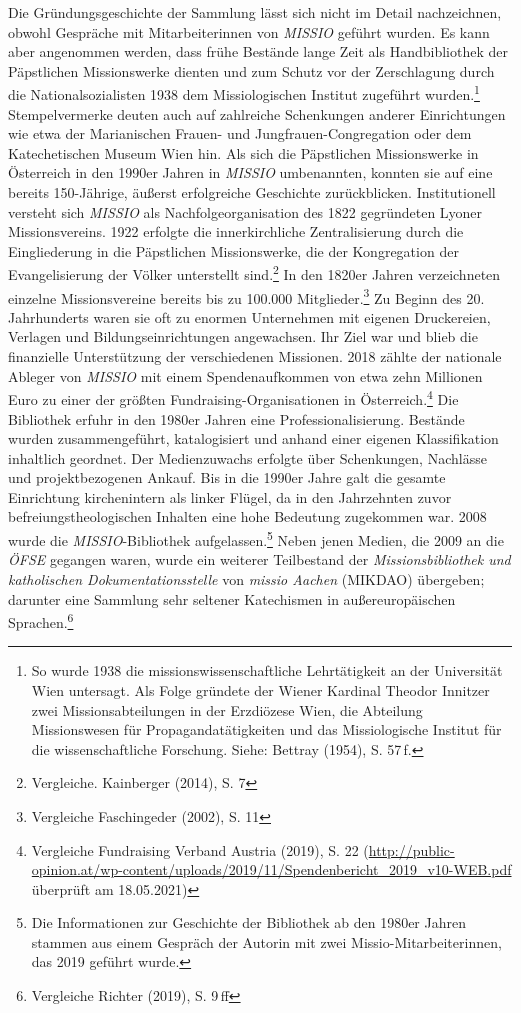 \documentclass[a4paper,
fontsize=11pt,
oneside,
numbers=noperiodatend,
parskip=half-,
bibliography=totoc,
final
]{scrartcl}
\begin{document}
Die Gründungsgeschichte der Sammlung lässt sich nicht im Detail
nachzeichnen, obwohl Gespräche mit Mitarbeiterinnen von \emph{MISSIO}
geführt wurden. Es kann aber angenommen werden, dass frühe Bestände
lange Zeit als Handbibliothek der Päpstlichen Missionswerke dienten und
zum Schutz vor der Zerschlagung durch die Nationalsozialisten 1938 dem
Missiologischen Institut zugeführt wurden.\footnote{So wurde 1938 die
  missionswissenschaftliche Lehrtätigkeit an der Universität Wien
  untersagt. Als Folge gründete der Wiener Kardinal Theodor Innitzer
  zwei Missionsabteilungen in der Erzdiözese Wien, die Abteilung
  Missionswesen für Propagandatätigkeiten und das Missiologische
  Institut für die wissenschaftliche Forschung. Siehe: Bettray (1954),
  S. 57\,f.} Stempelvermerke deuten auch auf zahlreiche Schenkungen
anderer Einrichtungen wie etwa der Marianischen Frauen- und
Jungfrauen-Congregation oder dem Katechetischen Museum Wien hin. Als
sich die Päpstlichen Missionswerke in Österreich in den 1990er Jahren in
\emph{MISSIO} umbenannten, konnten sie auf eine bereits 150-Jährige,
äußerst erfolgreiche Geschichte zurückblicken. Institutionell versteht
sich \emph{MISSIO} als Nachfolgeorganisation des 1822 gegründeten Lyoner
Missionsvereins. 1922 erfolgte die innerkirchliche Zentralisierung durch
die Eingliederung in die Päpstlichen Missionswerke, die der Kongregation
der Evangelisierung der Völker unterstellt sind.\footnote{Vergleiche.
  Kainberger (2014), S. 7} In den 1820er Jahren verzeichneten einzelne
Missionsvereine bereits bis zu 100.000 Mitglieder.\footnote{Vergleiche
  Faschingeder (2002), S. 11} Zu Beginn des 20. Jahrhunderts waren sie
oft zu enormen Unternehmen mit eigenen Druckereien, Verlagen und
Bildungseinrichtungen angewachsen. Ihr Ziel war und blieb die
finanzielle Unterstützung der verschiedenen Missionen. 2018 zählte der
nationale Ableger von \emph{MISSIO} mit einem Spendenaufkommen von etwa
zehn Millionen Euro zu einer der größten Fundraising-Organisationen in
Österreich.\footnote{Vergleiche Fundraising Verband Austria (2019), S.
  22
  (\url{http://public-opinion.at/wp-content/uploads/2019/11/Spendenbericht_2019_v10-WEB.pdf}
  überprüft am 18.05.2021)} Die Bibliothek erfuhr in den 1980er Jahren
eine Professionalisierung. Bestände wurden zusammengeführt,
katalogisiert und anhand einer eigenen Klassifikation inhaltlich
geordnet. Der Medienzuwachs erfolgte über Schenkungen, Nachlässe und
projektbezogenen Ankauf. Bis in die 1990er Jahre galt die gesamte
Einrichtung kirchenintern als linker Flügel, da in den Jahrzehnten zuvor
befreiungstheologischen Inhalten eine hohe Bedeutung zugekommen war.
2008 wurde die \emph{MISSIO}-Bibliothek aufgelassen.\footnote{Die
  Informationen zur Geschichte der Bibliothek ab den 1980er Jahren
  stammen aus einem Gespräch der Autorin mit zwei
  Missio-Mitarbeiterinnen, das 2019 geführt wurde.} Neben jenen Medien,
die 2009 an die \emph{ÖFSE} gegangen waren, wurde ein weiterer
Teilbestand der \emph{Missionsbibliothek und katholischen
Dokumentationsstelle} von \emph{missio Aachen} (MIKDAO) übergeben;
darunter eine Sammlung sehr seltener Katechismen in außereuropäischen
Sprachen.\footnote{Vergleiche Richter (2019), S. 9\,ff}
\end{document}
